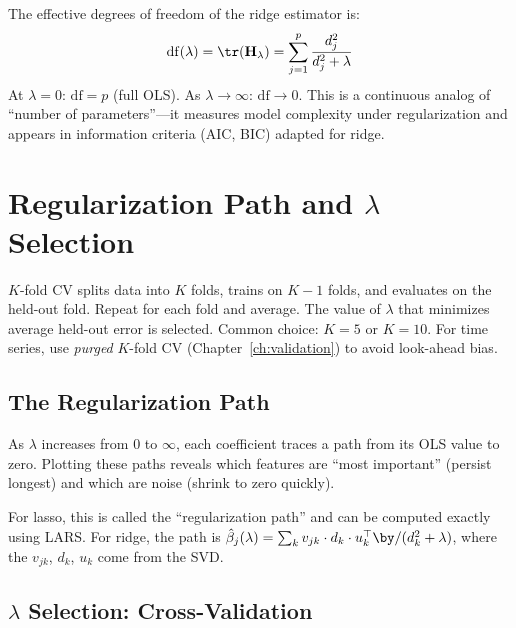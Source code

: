\begin{definition}
The effective degrees of freedom of the ridge estimator is:
\begin{equation}
\mathrm{df}(\lambda) = \tr(\mathbf{H}_\lambda) = \sum_{j=1}^p \frac{d_j^2}{d_j^2 + \lambda}
\label{eq:effective-df}
\end{equation}
At $\lambda = 0$: $\mathrm{df} = p$ (full OLS). As $\lambda \to \infty$: $\mathrm{df} \to 0$.
This is a continuous analog of ``number of parameters''---it measures model complexity under regularization and appears in information criteria (AIC, BIC) adapted for ridge.
\end{definition}

\section{Regularization Path and $\lambda$ Selection}
\label{sec:lambda-selection}

\begin{prereq}
$K$-fold CV splits data into $K$ folds, trains on $K{-}1$ folds, and evaluates on the held-out fold.
Repeat for each fold and average.
The value of $\lambda$ that minimizes average held-out error is selected.
Common choice: $K = 5$ or $K = 10$.
For time series, use \emph{purged} $K$-fold CV (Chapter~\ref{ch:validation}) to avoid look-ahead bias.
\end{prereq}

\subsection{The Regularization Path}

As $\lambda$ increases from $0$ to $\infty$, each coefficient traces a path from its OLS value to zero.
Plotting these paths reveals which features are ``most important'' (persist longest) and which are noise (shrink to zero quickly).

For lasso, this is called the ``regularization path'' and can be computed exactly using LARS.
For ridge, the path is $\hat{\beta}_j(\lambda) = \sum_k v_{jk} \cdot d_k \cdot u_k^\top \by / (d_k^2 + \lambda)$, where the $v_{jk}$, $d_k$, $u_k$ come from the SVD.

\subsection{$\lambda$ Selection: Cross-Validation}

